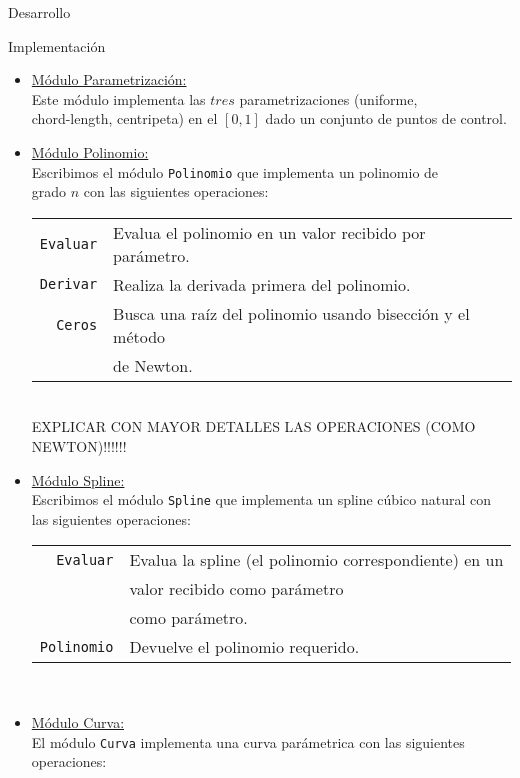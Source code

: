 \begin{section}{Desarrollo}
\begin{subsection}{Implementación}
		\begin{itemize}
			\item \underline{Módulo Parametrización:}\\
				Este módulo implementa las $tres$ parametrizaciones (uniforme,\\
				chord-length, centripeta) en el $[0,1]$ dado un conjunto de puntos de control.
			\item \underline{Módulo Polinomio:}\\
				Escribimos el módulo \texttt{Polinomio} que implementa un polinomio de\\
				grado $n$ con las siguientes operaciones:\\
				
				\begin{tabular}{rl}
					\texttt{Evaluar} & Evalua el polinomio en un valor recibido por parámetro.\\
					\texttt{Derivar} & Realiza la derivada primera del polinomio.\\
					\texttt{Ceros}   & Busca una raíz del polinomio usando bisección y el método\\
									 & de Newton.\\
				\end{tabular}\\ 
				EXPLICAR CON MAYOR DETALLES LAS OPERACIONES (COMO NEWTON)!!!!!!
		
			\item \underline{Módulo Spline:}\\
				Escribimos el módulo \texttt{Spline} que implementa un spline cúbico natural con las siguientes operaciones:\\
				
				\begin{tabular}{rl}
					\texttt{Evaluar} & Evalua la spline (el polinomio correspondiente) en un\\
									 & valor recibido como parámetro\\
									 & como parámetro.\\
					\texttt{Polinomio} & Devuelve el polinomio requerido.\\
				\end{tabular}\\

			\item \underline{Módulo Curva:}\\
				El módulo \texttt{Curva} implementa una curva parámetrica con las siguientes operaciones:\\
				

\end{itemize}
\end{subsection}
\end{section}
